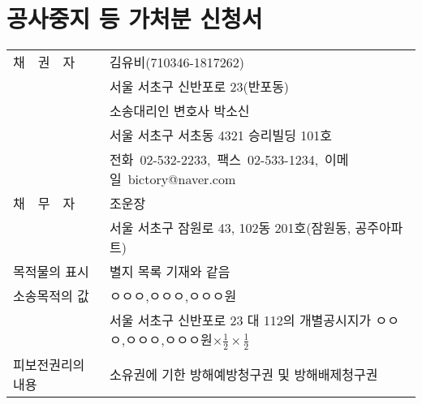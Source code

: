 \documentclass[12pt]{oblivoir}
\begin{document}
\chapter*{\Large 공사중지 등 가처분 신청서}
\begin{longtabu} to  %
  채~~권~~자&
  김유비(710346-1817262)\\
  &
  서울 서초구 신반포로 23(반포동)\\
  &
  소송대리인 변호사 박소신\\
  &
  서울 서초구 서초동 4321 승리빌딩 101호\\
  &
  \mbox{전화 02-532-2233, 팩스 02-533-1234, 이메일 bictory@naver.com}
  \\
채~~무~~자&조운장\\
&서울 서초구 잠원로 43, 102동 201호(잠원동, 공주아파트)\\
목적물의 표시&별지 목록 기재와 같음\\
소송목적의 값&ㅇㅇㅇ,ㅇㅇㅇ,ㅇㅇㅇ원\\
&서울 서초구 신반포로 23 대 112의 개별공시지가 ㅇㅇㅇ,ㅇㅇㅇ,ㅇㅇㅇ원$\times\frac{1}{2}\times\frac{1}{2}$\\
피보전권리의 내용&소유권에 기한 방해예방청구권 및 방해배제청구권
\end{longtabu}
\vspace{5em}
\end{document}
